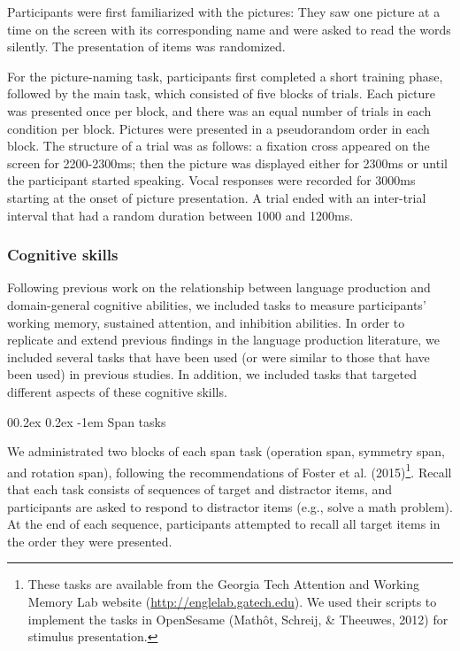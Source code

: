 \documentclass[
  man,floatsintext]{apa6}
\makeatletter
\let\oldparagraph\paragraph
\renewcommand{\paragraph}[1]{\oldparagraph{#1}\mbox{}}
\renewcommand{\paragraph}{\@startsection{paragraph}{4}{\parindent}%
  {0\baselineskip \@plus 0.2ex \@minus 0.2ex}%
  {-1em}%
  {\normalfont\normalsize\bfseries\itshape\typesectitle}}
\makeatother
\begin{document}
Participants were first familiarized with the pictures: They saw one picture at a time on the screen with its corresponding name and were asked to read the words silently. The presentation of items was randomized.

For the picture-naming task, participants first completed a short training phase, followed by the main task, which consisted of five blocks of trials. Each picture was presented once per block, and there was an equal number of trials in each condition per block. Pictures were presented in a pseudorandom order in each block. The structure of a trial was as follows: a fixation cross appeared on the screen for 2200-2300ms; then the picture was displayed either for 2300ms or until the participant started speaking. Vocal responses were recorded for 3000ms starting at the onset of picture presentation. A trial ended with an inter-trial interval that had a random duration between 1000 and 1200ms.

\hypertarget{cognitive-skills}{%
\subsubsection{Cognitive skills}\label{cognitive-skills}}

Following previous work on the relationship between language production and domain-general cognitive abilities, we included tasks to measure participants' working memory, sustained attention, and inhibition abilities. In order to replicate and extend previous findings in the language production literature, we included several tasks that have been used (or were similar to those that have been used) in previous studies. In addition, we included tasks that targeted different aspects of these cognitive skills.

\hypertarget{span-tasks}{%
\paragraph{Span tasks}\label{span-tasks}}

We administrated two blocks of each span task (operation span, symmetry span, and rotation span), following the recommendations of Foster et al. (2015)\footnote{These tasks are available from the Georgia Tech Attention and Working Memory Lab website (\url{http://englelab.gatech.edu}). We used their scripts to implement the tasks in OpenSesame (Mathôt, Schreij, \& Theeuwes, 2012) for stimulus presentation.}. Recall that each task consists of sequences of target and distractor items, and participants are asked to respond to distractor items (e.g., solve a math problem). At the end of each sequence, participants attempted to recall all target items in the order they were presented.
\end{document}
